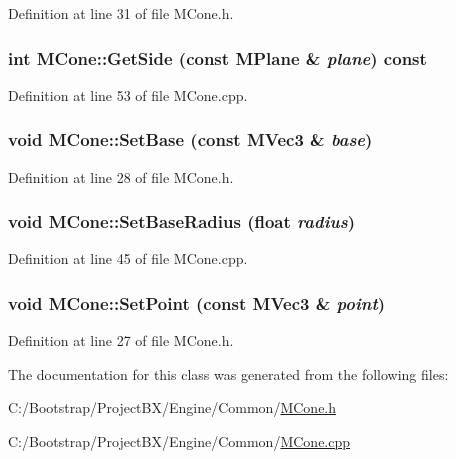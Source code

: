 Definition at line 31 of file MCone.h.\hypertarget{class_m_cone_815fe27bdd5c6065acb810e4f3924dbc}{
\subsubsection[{GetSide}]{\setlength{\rightskip}{0pt plus 5cm}int MCone::GetSide (const {\bf MPlane} \& {\em plane}) const}}
\label{class_m_cone_815fe27bdd5c6065acb810e4f3924dbc}




Definition at line 53 of file MCone.cpp.\hypertarget{class_m_cone_b9a58767cd584b549fbc3e36a5184078}{
\subsubsection[{SetBase}]{\setlength{\rightskip}{0pt plus 5cm}void MCone::SetBase (const {\bf MVec3} \& {\em base})}}
\label{class_m_cone_b9a58767cd584b549fbc3e36a5184078}




Definition at line 28 of file MCone.h.\hypertarget{class_m_cone_1873ff8a7234cf756b5a947a06fc4b30}{
\subsubsection[{SetBaseRadius}]{\setlength{\rightskip}{0pt plus 5cm}void MCone::SetBaseRadius (float {\em radius})}}
\label{class_m_cone_1873ff8a7234cf756b5a947a06fc4b30}




Definition at line 45 of file MCone.cpp.\hypertarget{class_m_cone_b042fd985ba8aae1dd3cf354e4422011}{
\subsubsection[{SetPoint}]{\setlength{\rightskip}{0pt plus 5cm}void MCone::SetPoint (const {\bf MVec3} \& {\em point})}}
\label{class_m_cone_b042fd985ba8aae1dd3cf354e4422011}




Definition at line 27 of file MCone.h.

The documentation for this class was generated from the following files:\begin{CompactItemize}
\item 
C:/Bootstrap/ProjectBX/Engine/Common/\hyperlink{_m_cone_8h}{MCone.h}\item 
C:/Bootstrap/ProjectBX/Engine/Common/\hyperlink{_m_cone_8cpp}{MCone.cpp}\end{CompactItemize}
